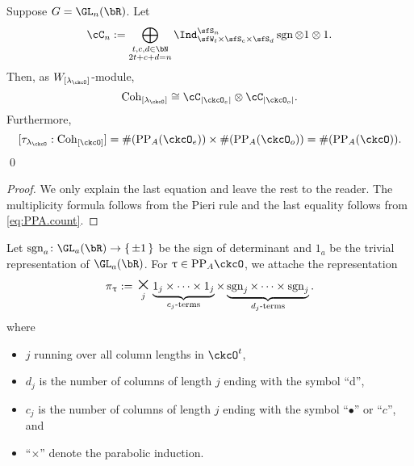 \documentclass[counting_main.tex]{subfiles}
\begin{document}
\begin{lem} \label{lem:GL.count}
  Suppose $G = \GL_{n}(\bR)$. Let
  \[
    \cC_n := \bigoplus_{\substack{t,c,d\in \bN \\2t+c+d=n}} \Ind_{\sfW_t\times \sfS_c\times \sfS_d}^{\sfS_{n}} \sgn \otimes 1\otimes 1.
  \]
  Then, as $W_{[\lamck]}$-module,
  \[
    \Cint{\lamck} \cong \cC_{\abs{\ckcO_{e}}}\otimes \cC_{\abs{\ckcO_{o}}}.
  \]
  Furthermore,
  \begin{equation}\label{eq:A.count}
    [\tau_{\lamck}: \Cint{\ckcO}] = \# (\PP_{A}(\ckcO_{e}))\times
    \# (\PP_{A}(\ckcO_{o})) = \# (\PP_{A}(\ckcO)).
  \end{equation}
  \qed
\end{lem}
\begin{proof}
  We only explain the last equation and leave the rest to the reader.
  The multiplicity formula follows from the Pieri rule and the last equality
  follows from \eqref{eq:PPA.count}.
\end{proof}


Let $\sgn_a\colon \GL_a(\bR)\rightarrow \set{\pm 1}$ be the sign of determinant
and $1_a$ be the trivial representation of $\GL_a(\bR)$.
For
$\uptau\in \PP_{A}{\ckcO}$, we attache the representation
\begin{equation}\label{eq:u.GLR}
  \pi_\uptau :=
  \bigtimes_{j} \underbrace{1_j \times \cdots \times 1_j}_{c_j\text{-terms}}\times
  \underbrace{\sgn_j \times \cdots \times {\sgn_j} }_{d_j\text{-terms}}.
\end{equation}
where
\begin{itemize}
  \item $j$ running over all column lengths in $\ckcO^t$,
  \item $d_j$ is the number of columns of length $j$ ending with the symbol
        ``d'',
  \item $c_j$ is the number of columns of length $j$ ending with the symbol
        ``$\bullet$'' or ``$c$'', and
  \item ``$\times$'' denote the parabolic induction.
\end{itemize}
\end{document}
